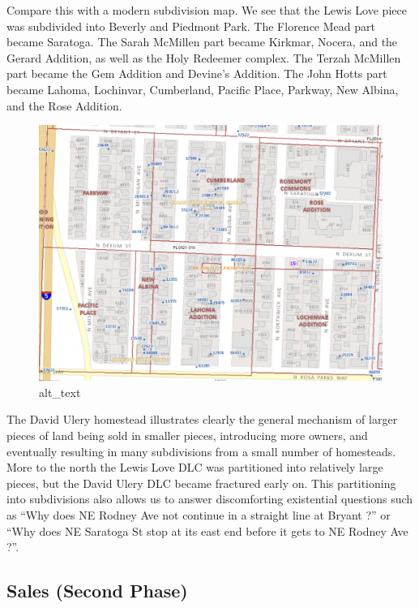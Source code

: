 \documentclass[
  12pt,
]{book}
\begin{document}
Compare this with a modern subdivision map. We see that the Lewis Love piece was subdivided into Beverly and Piedmont Park. The Florence Mead part became Saratoga. The Sarah McMillen part became Kirkmar, Nocera, and the Gerard Addition, as well as the Holy Redeemer complex. The Terzah McMillen part became the Gem Addition and Devine's Addition. The John Hotts part became Lahoma, Lochinvar, Cumberland, Pacific Place, Parkway, New Albina, and the Rose Addition.

\begin{figure}
\centering
\includegraphics{images/0202a_images/image4.png}
\caption{alt\_text}
\end{figure}

The David Ulery homestead illustrates clearly the general mechanism of larger pieces of land being sold in smaller pieces, introducing more owners, and eventually resulting in many subdivisions from a small number of homesteads. More to the north the Lewis Love DLC was partitioned into relatively large pieces, but the David Ulery DLC became fractured early on. This partitioning into subdivisions also allows us to answer discomforting existential questions such as ``Why does NE Rodney Ave not continue in a straight line at Bryant ?'' or ``Why does NE Saratoga St stop at its east end before it gets to NE Rodney Ave ?''.

\hypertarget{sales-second-phase}{%
\subsection{Sales (Second Phase)}\label{sales-second-phase}}
\end{document}

